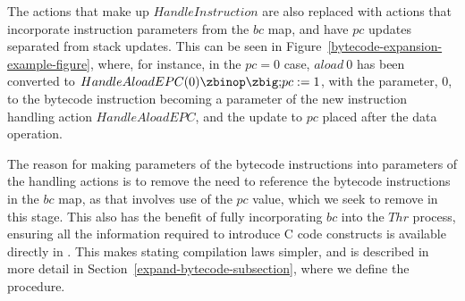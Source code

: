 The actions that make up $HandleInstruction$ are also replaced with
actions that incorporate instruction parameters from the $bc$ map, and
have $pc$ updates separated from stack updates.
This can be seen in Figure~\ref{bytecode-expansion-example-figure},
where, for instance, in the $pc = 0$ case, $aload~0$ has been
converted to $HandleAloadEPC(0) \circseq pc := 1$, with the parameter,
$0$, to the bytecode instruction becoming a parameter of the new
instruction handling action $HandleAloadEPC$, and the update to $pc$
placed after the data operation.

The reason for making parameters of the bytecode instructions into
parameters of the handling actions is to remove the need to reference
the bytecode instructions in the $bc$ map, as that involves use of the
$pc$ value, which we seek to remove in this stage.
This also has the benefit of fully incorporating $bc$ into the $Thr$
process, ensuring all the information required to introduce C code
constructs is available directly in \Circus{}.
This makes stating compilation laws simpler, and is described in more
detail in Section~\ref{expand-bytecode-subsection}, where we define
the  procedure.

